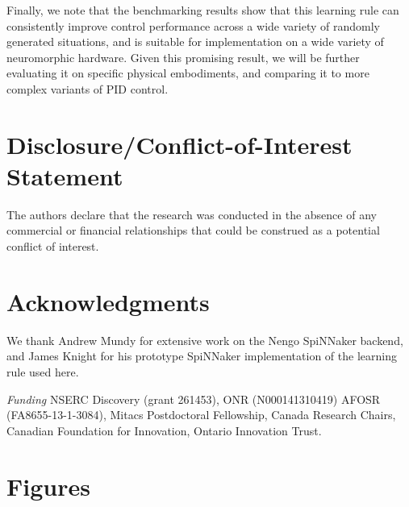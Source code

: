 \documentclass{frontiersSCNS} %
\begin{document}
Finally, we note that the benchmarking results show that this learning rule
can consistently improve control performance across a wide variety of randomly
generated situations, and is suitable for implementation on a wide variety
of neuromorphic hardware.  Given this promising result, we will be further
evaluating it on specific physical embodiments, and comparing it to more
complex variants of PID control.

\section*{Disclosure/Conflict-of-Interest Statement}

The authors declare that the research was conducted in the absence of any commercial or financial relationships that could be construed as a potential conflict of interest.

\section*{Acknowledgments}

We thank Andrew Mundy for extensive work on the Nengo SpiNNaker backend, and
James Knight for his prototype SpiNNaker implementation of the learning rule used here.

\textit{Funding\textcolon} 
NSERC Discovery (grant 261453),
ONR (N000141310419)
AFOSR (FA8655-13-1-3084),
Mitacs Postdoctoral Fellowship,
Canada Research Chairs,
Canadian Foundation for Innovation,
Ontario Innovation Trust.




\section*{Figures}

\end{document}
